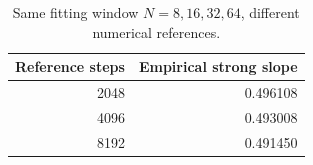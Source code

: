 \begin{table}[H]\centering\small
\caption{Same fitting window $N=8,16,32,64$, different numerical references.}\label{tab:reference-slopes}
\begin{tabular}{rr}\toprule
Reference steps & Empirical strong slope\\\midrule
2048 & 0.496108\\
4096 & 0.493008\\
8192 & 0.491450\\
\bottomrule\end{tabular}
\end{table}
